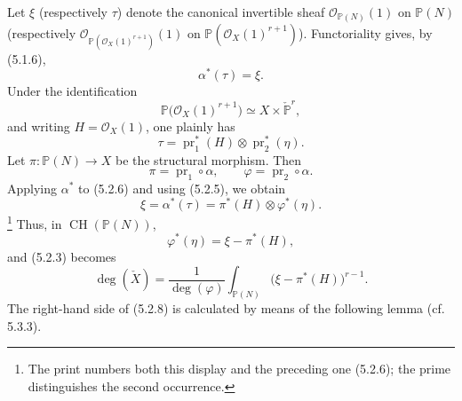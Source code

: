 Let $\xi$ (respectively $\tau$) denote the canonical invertible sheaf
$\mathcal O_{\mathbb P(N)}(1)$ on $\mathbb P(N)$ (respectively
$\mathcal O_{\mathbb P(\mathcal O_X(1)^{r+1})}(1)$ on
$\mathbb P(\mathcal O_X(1)^{r+1})$).  Functoriality gives, by
(5.1.6),
\begin{equation}\tag{5.2.5}
\alpha^*(\tau)=\xi.
\end{equation}
Under the identification
\[
\mathbb P\bigl(\mathcal O_X(1)^{r+1}\bigr)
\simeq X\times\check{\mathbb P}^{r},
\]
and writing $H=\mathcal O_X(1)$, one plainly has
\begin{equation}\tag{5.2.6}
\tau=\operatorname{pr}_1^*(H)\otimes\operatorname{pr}_2^*(\eta).
\end{equation}
Let $\pi:\mathbb P(N)\to X$ be the structural morphism.  Then
\[
\pi=\operatorname{pr}_1\circ\alpha,
\qquad
\varphi=\operatorname{pr}_2\circ\alpha.
\]
Applying $\alpha^*$ to (5.2.6) and using (5.2.5), we obtain
\begin{equation}\tag{5.2.6$'$}
\xi=\alpha^*(\tau)=\pi^*(H)\otimes\varphi^*(\eta).
\end{equation}
\footnote{The print numbers both this display and the preceding one
(5.2.6); the prime distinguishes the second occurrence.}
Thus, in $\operatorname{CH}(\mathbb P(N))$,
\begin{equation}\tag{5.2.7}
\varphi^*(\eta)=\xi-\pi^*(H),
\end{equation}
and (5.2.3) becomes
\begin{equation}\tag{5.2.8}
\deg(\check X)
=\frac{1}{\deg(\varphi)}
\int_{\mathbb P(N)}\bigl(\xi-\pi^*(H)\bigr)^{r-1}.
\end{equation}
The right-hand side of (5.2.8) is calculated by means of the
following lemma (cf. 5.3.3).
